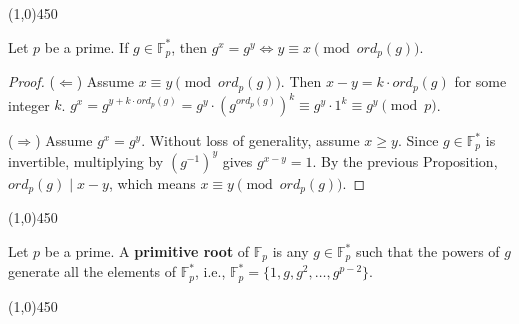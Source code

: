 \begin{center}
    \vspace{10pt}
    \line(1,0){450}
    \vspace{25pt}
\end{center}

\begin{proposition}
    Let $p$ be a prime. If $g \in \mathbb{F}_{p}^{*}$, then $g^{x} = g^{y} \iff y \equiv x \pmod{ord_{p}(g)}$.
\end{proposition}
\begin{proof}
    ($\Leftarrow$) Assume $x \equiv y \pmod{ord_{p}(g)}$. Then $x-y = k \cdot ord_{p}(g)$ for some integer $k$.
    $g^{x} = g^{y+k \cdot ord_{p}(g)} = g^{y} \cdot (g^{ord_{p}(g)})^{k} \equiv g^{y} \cdot 1^{k} \equiv g^{y} \pmod{p}$.

    ($\Rightarrow$) Assume $g^{x} = g^{y}$. Without loss of generality, assume $x \geq y$.
    Since $g \in \mathbb{F}_{p}^{*}$ is invertible, multiplying by $(g^{-1})^{y}$ gives $g^{x-y} = 1$.
    By the previous Proposition, $ord_{p}(g) \mid x-y$, which means $x \equiv y \pmod{ord_{p}(g)}$.
\end{proof}

\begin{center}
    \vspace{10pt}
    \line(1,0){450}
    \vspace{25pt}
\end{center}

\begin{definition}
    Let $p$ be a prime.
    A \textbf{primitive root} of $\mathbb{F}_{p}$ is any $g \in \mathbb{F}_{p}^{*}$ such that the powers of $g$ generate all the elements of $\mathbb{F}_{p}^{*}$, i.e., $\mathbb{F}_{p}^{*} = \{1, g, g^{2}, \dots, g^{p-2}\}$.
\end{definition}

\begin{center}
    \vspace{10pt}
    \line(1,0){450}
    \vspace{25pt}
\end{center}

